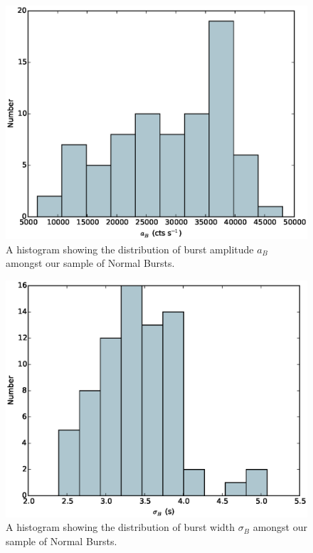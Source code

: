 \begin{figure}
  \centering
  \includegraphics[width=.9\linewidth, trim={0cm 0 0cm 0},clip]{images/appendix_burst_pa_hist.eps}
  \caption[Histogram showing the distribution of $a_B$ amongst Normal Bursts.]{A histogram showing the distribution of burst amplitude $a_B$ amongst our sample of Normal Bursts.}
  \label{fig:app_hist_ab}
\end{figure}

\begin{figure}
  \centering
  \includegraphics[width=.9\linewidth, trim={0cm 0 0cm 0},clip]{images/appendix_burst_sigma_hist.eps}
  \caption[Histogram showing the distribution of $\sigma_B$ amongst Normal Bursts.]{A histogram showing the distribution of burst width $\sigma_B$ amongst our sample of Normal Bursts.}
  \label{fig:app_hist_sigb}
\end{figure}

